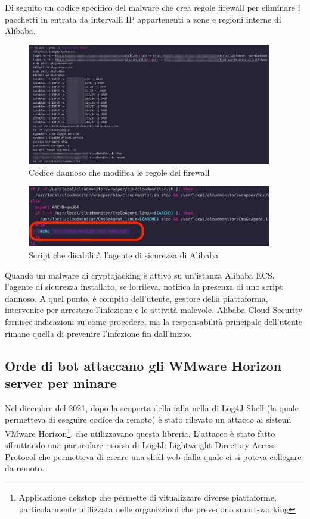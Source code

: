 \documentclass[12pt,a4paper]{article}
\begin{document}
Di seguito un codice specifico del malware che crea regole firewall per
eliminare i pacchetti in entrata da intervalli IP appartenenti a zone e regioni
interne di Alibaba.

\begin{figure}[ht]
    \centering
    \includegraphics[width=0.95\textwidth]{./images/alibaba_firewall.png}
    \caption{Codice dannoso che modifica le regole del firewall}
    \label{fig:alibaba_firewall}
\end{figure}

\begin{figure}[ht]
    \centering
    \includegraphics[width=0.95\textwidth]{./images/alibaba_agent_disable.png}
    \caption{Script che disabilità l'agente di sicurezza di Alibaba}
    \label{fig:alibaba_agent}
\end{figure}

Quando un malware di cryptojacking è attivo su un'istanza Alibaba ECS, l'agente
di sicurezza installato, se lo rileva, notifica la presenza di uno script
dannoso. A quel punto, è compito dell'utente, gestore della piattaforma,
intervenire per arrestare l'infezione e le attività malevole. Alibaba Cloud
Security fornisce indicazioni su come procedere, ma la responsabilità principale
dell'utente rimane quella di prevenire l'infezione fin dall'inizio.

\subsection{Orde di bot attaccano gli WMware Horizon server per minare}
Nel dicembre del 2021, dopo la scoperta della falla nella di Log4J Shell (la
quale permetteva di eseguire codice da remoto) è stato rilevato un attacco ai
sistemi VMware Horizon\footnote{Applicazione dekstop che permette di
vitualizzare diverse piattaforme, particolarmente utilizzata nelle organizzioni
che prevedono smart-working}, che utilizzavano questa libreria. L'attacco è
stato fatto sffruttando una particolare risorsa di Log4J: Lightweight Directory
Access Protocol che permetteva di creare una shell web dalla quale ci si poteva
collegare da remoto.\cite{VMware}
\end{document}
